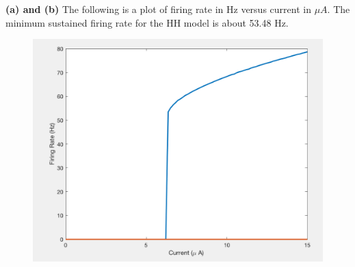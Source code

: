 \documentclass[]{article}
\begin{document}
\textbf{(a) and (b)} The following is a plot of firing rate in Hz versus current in $\mu A$. The minimum sustained firing rate for the HH model is about 53.48 Hz.

\begin{figure}
    \centering
    \includegraphics{const_current_firing_rate.png}
    \label{fig:const_current}
\end{figure}
\end{document}
